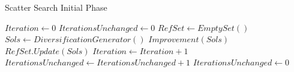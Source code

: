 \begin{algorithm}
  \caption{Scatter Search Initial Phase} \label{alg:SSInitial}
  \begin{algorithmic}
    \State $Iteration \gets 0$
    \State $IterationsUnchanged \gets 0$
    \State $RefSet \gets EmptySet()$
    \Repeat
    \State $Sols \gets DiversificationGenerator()$
    \State $Improvement(Sols)$
    \State $RefSet.Update(Sols)$
    \State $Iteration \gets Iteration + 1$
    \State $IterationsUnchanged \gets IterationsUnchanged + 1$
    \State $IterationsUnchanged \gets 0$
    \EndIf
    \EndProcedure
  \end{algorithmic}
\end{algorithm}
